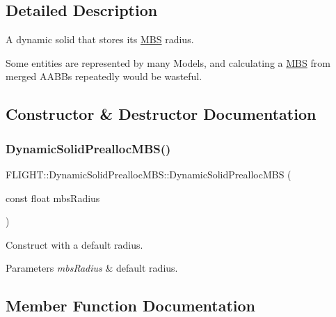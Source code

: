 \subsection{Detailed Description}
A dynamic solid that stores it\textquotesingle{}s \hyperlink{class_f_l_i_g_h_t_1_1_m_b_s}{M\+BS} radius. 

Some entities are represented by many Models, and calculating a \hyperlink{class_f_l_i_g_h_t_1_1_m_b_s}{M\+BS} from merged A\+A\+B\+Bs repeatedly would be wasteful. 

\subsection{Constructor \& Destructor Documentation}
\mbox{\label{class_f_l_i_g_h_t_1_1_dynamic_solid_prealloc_m_b_s_a93d8632f202492bc758f246f449264f5}} 
\subsubsection{\texorpdfstring{Dynamic\+Solid\+Prealloc\+M\+B\+S()}{DynamicSolidPreallocMBS()}}
{\footnotesize\ttfamily F\+L\+I\+G\+H\+T\+::\+Dynamic\+Solid\+Prealloc\+M\+B\+S\+::\+Dynamic\+Solid\+Prealloc\+M\+BS (\begin{DoxyParamCaption}\item[{const float}]{mbs\+Radius }\end{DoxyParamCaption})}



Construct with a default radius. 


\begin{DoxyParams}{Parameters}
{\em mbs\+Radius} & default radius. \\
\hline
\end{DoxyParams}


\subsection{Member Function Documentation}
\mbox{\label{class_f_l_i_g_h_t_1_1_dynamic_solid_prealloc_m_b_s_ab509519b0315831b085e5478ce6ea50f}} 

